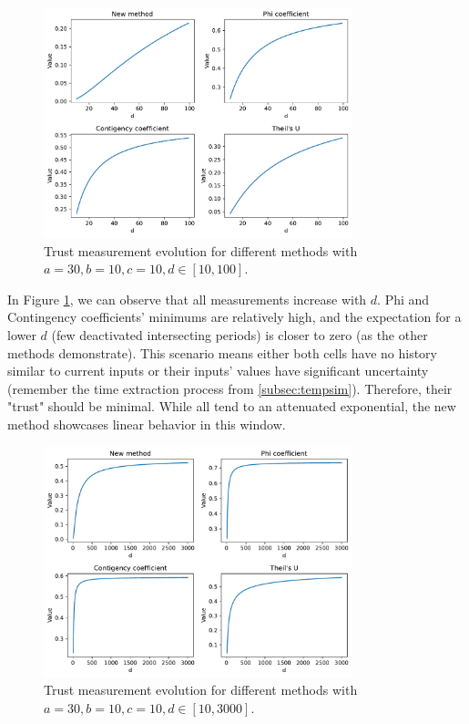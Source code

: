\begin{figure}[h!]
\centering
    \includegraphics[width=0.8\textwidth]{figures/chapter4/cell/trust_tests/1_a.pdf}
    \caption{Trust measurement evolution for different methods with $a=30, b=10, c=10, d \in [10, 100]$.}
    \label{fig:trust_test_1_a}
\end{figure}
\FloatBarrier


In Figure \ref{fig:trust_test_1_a}, we can observe that all measurements increase with $d$. Phi and Contingency coefficients' minimums are relatively high, and the expectation for a lower $d$ (few deactivated intersecting periods) is closer to zero (as the other methods demonstrate). This scenario means either both cells have no history similar to current inputs or their inputs' values have significant uncertainty (remember the time extraction process from \ref{subsec:tempsim}). Therefore, their "trust" should be minimal. While all tend to an attenuated exponential, the new method showcases linear behavior in this window.

\begin{figure}[h!]
\centering
    \includegraphics[width=0.8\textwidth]{figures/chapter4/cell/trust_tests/1_b.pdf}
    \caption{Trust measurement evolution for different methods with $a=30, b=10, c=10, d \in [10, 3000]$.}
    \label{fig:trust_test_1_b}
\end{figure}
\FloatBarrier


